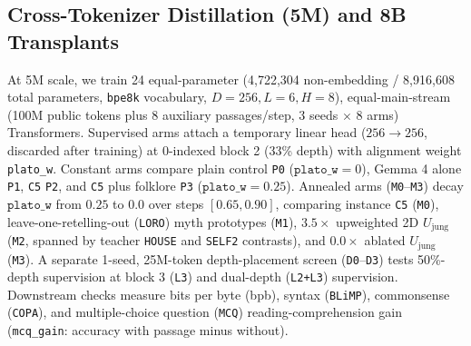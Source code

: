 \documentclass[conference]{IEEEtran}
\begin{document}
\subsection{Cross-Tokenizer Distillation (5M) and 8B Transplants}
At 5M scale, we train 24 equal-parameter (4,722,304 non-embedding / 8,916,608 total parameters, \texttt{bpe8k} vocabulary, $D=256, L=6, H=8$), equal-main-stream (100M public tokens plus 8 auxiliary passages/step, 3 seeds $\times$ 8 arms) Transformers. Supervised arms attach a temporary linear head ($256\to256$, discarded after training) at 0-indexed block 2 (33\% depth) with alignment weight \texttt{plato\_w}. Constant arms compare plain control \texttt{P0} ($\texttt{plato\_w}=0$), Gemma 4 alone \texttt{P1}, \texttt{C5} \texttt{P2}, and \texttt{C5} plus folklore \texttt{P3} ($\texttt{plato\_w}=0.25$). Annealed arms (\texttt{M0}--\texttt{M3}) decay $\texttt{plato\_w}$ from $0.25$ to $0.0$ over steps $[0.65,0.90]$, comparing instance \texttt{C5} (\texttt{M0}), leave-one-retelling-out (\texttt{LORO}) myth prototypes (\texttt{M1}), $3.5\times$ upweighted 2D $U_{\text{jung}}$ (\texttt{M2}, spanned by teacher \texttt{HOUSE} and \texttt{SELF2} contrasts), and $0.0\times$ ablated $U_{\text{jung}}$ (\texttt{M3}). A separate 1-seed, 25M-token depth-placement screen (\texttt{D0}--\texttt{D3}) tests 50\%-depth supervision at block 3 (\texttt{L3}) and dual-depth (\texttt{L2+L3}) supervision. Downstream checks measure bits per byte (bpb), syntax (\texttt{BLiMP}), commonsense (\texttt{COPA}), and multiple-choice question (\texttt{MCQ}) reading-comprehension gain (\texttt{mcq\_gain}: accuracy with passage minus without).
\end{document}
